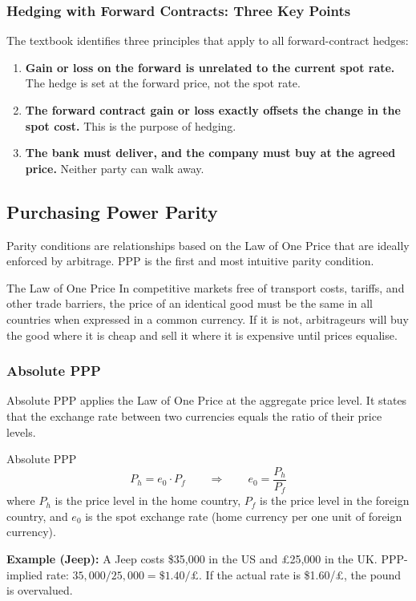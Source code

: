 \documentclass[11pt,a4paper]{article}
\begin{document}
\subsubsection{Hedging with Forward Contracts: Three Key Points}

The textbook identifies three principles that apply to all forward-contract hedges:
\begin{enumerate}
  \item \textbf{Gain or loss on the forward is unrelated to the current spot rate.} The hedge is set at the forward price, not the spot rate.
  \item \textbf{The forward contract gain or loss exactly offsets the change in the spot cost.} This is the purpose of hedging.
  \item \textbf{The bank must deliver, and the company must buy at the agreed price.} Neither party can walk away.
\end{enumerate}

\subsection{Purchasing Power Parity}

Parity conditions are relationships based on the Law of One Price that are ideally enforced by arbitrage. PPP is the first and most intuitive parity condition.

\begin{conceptbox}{The Law of One Price}
In competitive markets free of transport costs, tariffs, and other trade barriers, the price of an identical good must be the same in all countries when expressed in a common currency. If it is not, arbitrageurs will buy the good where it is cheap and sell it where it is expensive until prices equalise.
\end{conceptbox}

\subsubsection{Absolute PPP}

Absolute PPP applies the Law of One Price at the aggregate price level. It states that the exchange rate between two currencies equals the ratio of their price levels.

\begin{formulabox}{Absolute PPP}
\[
  P_h = e_0 \cdot P_f \qquad \Longrightarrow \qquad e_0 = \frac{P_h}{P_f}
\]
where $P_h$ is the price level in the home country, $P_f$ is the price level in the foreign country, and $e_0$ is the spot exchange rate (home currency per one unit of foreign currency).

\textbf{Example (Jeep):} A Jeep costs \$35{,}000 in the US and £25{,}000 in the UK. PPP-implied rate: $35{,}000/25{,}000 = \$1.40/\text{£}$. If the actual rate is \$1.60/£, the pound is overvalued.
\end{formulabox}
\end{document}
